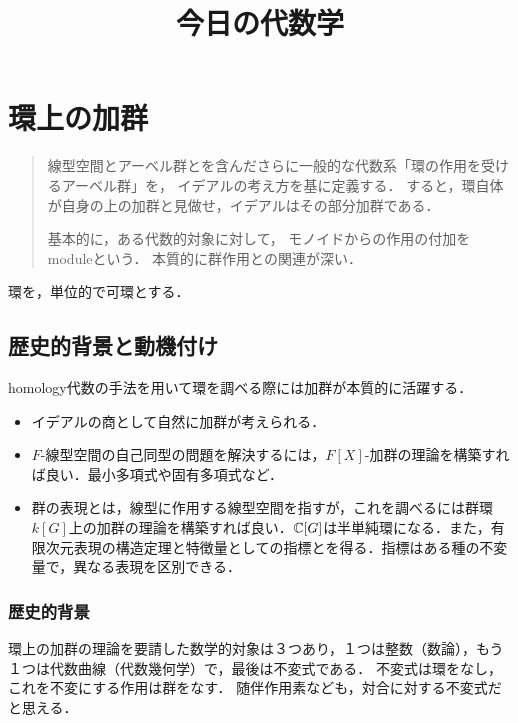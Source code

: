 \documentclass[uplatex,dvipdfmx]{jsreport}
\title{今日の代数学}
\author{}
\begin{document}
\tableofcontents

\chapter{環上の加群}

\begin{quotation}
    線型空間とアーベル群とを含んださらに一般的な代数系「環の作用を受けるアーベル群」を，
    イデアルの考え方を基に定義する．
    すると，環自体が自身の上の加群と見做せ，イデアルはその部分加群である．
    
    基本的に，ある代数的対象に対して，
    モノイドからの作用の付加をmoduleという．
    本質的に群作用との関連が深い．
\end{quotation}

\begin{notation*}
    環を，単位的で可環とする．
\end{notation*}

\section{歴史的背景と動機付け}

\begin{tcolorbox}[colframe=ForestGreen, colback=ForestGreen!10!white,breakable,colbacktitle=ForestGreen!40!white,coltitle=black,fonttitle=\bfseries\sffamily,
    title=]
    homology代数の手法を用いて環を調べる際には加群が本質的に活躍する．
    \begin{itemize}
        \item イデアルの商として自然に加群が考えられる．
        \item $F$-線型空間の自己同型の問題を解決するには，$F[X]$-加群の理論を構築すれば良い．最小多項式や固有多項式など．
        \item 群の表現とは，線型に作用する線型空間を指すが，これを調べるには群環$k[G]$上の加群の理論を構築すれば良い．$\mathbb{C}[G]$は半単純環になる．また，有限次元表現の構造定理と特徴量としての指標とを得る．指標はある種の不変量で，異なる表現を区別できる．
    \end{itemize}
\end{tcolorbox}


\subsection{歴史的背景}

\begin{tcolorbox}[colframe=ForestGreen, colback=ForestGreen!10!white,breakable,colbacktitle=ForestGreen!40!white,coltitle=black,fonttitle=\bfseries\sffamily,
title=]
    環上の加群の理論を要請した数学的対象は３つあり，１つは整数（数論），もう１つは代数曲線（代数幾何学）で，最後は不変式である．
    不変式は環をなし，これを不変にする作用は群をなす．
    随伴作用素なども，対合に対する不変式だと思える．
\end{tcolorbox}
\end{document}
